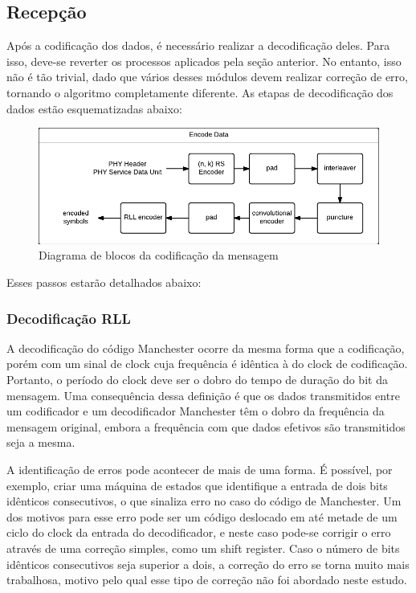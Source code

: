 	\subsection{Recepção}
	
	Após a codificação dos dados, é necessário realizar a decodificação deles. Para isso, deve-se reverter os processos aplicados pela seção anterior. No entanto, isso não é tão trivial, dado que vários desses módulos devem realizar correção de erro, tornando o algoritmo completamente diferente. As etapas de decodificação dos dados estão esquematizadas abaixo:

	\begin{figure}[htb]
		\caption{\label{fig_transmission_phy1} Diagrama de blocos da codificação da mensagem}
		\centering
		\includegraphics[width=0.6\textheight]{PHY1-transmission.pdf}
	\end{figure}

	Esses passos estarão detalhados abaixo:
	
	
	\subsubsection{Decodificação RLL}
	
	A decodificação do código Manchester ocorre da mesma forma que a codificação, porém com um sinal de clock cuja frequência é idêntica à do clock de codificação. Portanto, o período do clock deve ser o dobro do tempo de duração do bit da mensagem. Uma consequência dessa definição é que os dados transmitidos entre um codificador e um decodificador Manchester têm o dobro da frequência da mensagem original, embora a frequência com que dados efetivos são transmitidos seja a mesma.
	
	A identificação de erros pode acontecer de mais de uma forma. É possível, por exemplo, criar uma máquina de estados que identifique a entrada de dois bits idênticos consecutivos, o que sinaliza erro no caso do código de Manchester. Um dos motivos para esse erro pode ser um código deslocado em até metade de um ciclo do clock da entrada do decodificador, e neste caso pode-se corrigir o erro através de uma correção simples, como um shift register. Caso o número de bits idênticos consecutivos seja superior a dois, a correção do erro se torna muito mais trabalhosa, motivo pelo qual esse tipo de correção não foi abordado neste estudo.
	
